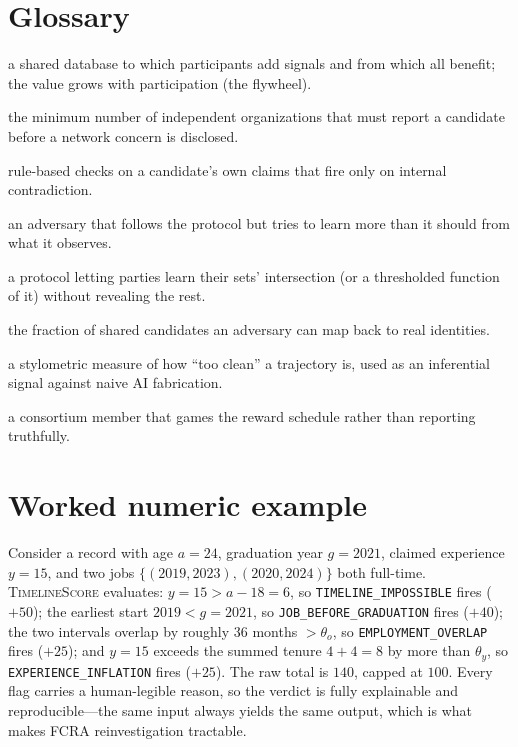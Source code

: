 \documentclass[11pt]{article}
\newcommand{\code}[1]{\texttt{\small #1}}
\begin{document}
\section{Glossary}\label{app:glossary}
\begin{description}[leftmargin=1.2em,itemsep=1pt]
\item[Contributory network] a shared database to which participants add signals
and from which all benefit; the value grows with participation (the flywheel).
\item[Corroboration threshold $t$] the minimum number of independent
organizations that must report a candidate before a network concern is disclosed.
\item[Deterministic layer] rule-based checks on a candidate's own claims that fire
only on internal contradiction.
\item[Honest-but-curious] an adversary that follows the protocol but tries to
learn more than it should from what it observes.
\item[Private set intersection (PSI)] a protocol letting parties learn their
sets' intersection (or a thresholded function of it) without revealing the rest.
\item[Re-identification rate] the fraction of shared candidates an adversary can
map back to real identities.
\item[Regularity score] a stylometric measure of how ``too clean'' a trajectory
is, used as an inferential signal against naive AI fabrication.
\item[Strategic participant] a consortium member that games the reward schedule
rather than reporting truthfully.
\end{description}

\section{Worked numeric example}\label{app:worked}
Consider a record with age $a=24$, graduation year $g=2021$, claimed experience
$y=15$, and two jobs $\{(2019,2023),(2020,2024)\}$ both full-time.
\textsc{TimelineScore} evaluates: $y=15 > a-18 = 6$, so
\code{TIMELINE\_IMPOSSIBLE} fires ($+50$); the earliest start $2019 < g=2021$, so
\code{JOB\_BEFORE\_GRADUATION} fires ($+40$); the two intervals overlap by roughly
36 months $> \theta_o$, so \code{EMPLOYMENT\_OVERLAP} fires ($+25$); and
$y=15$ exceeds the summed tenure $4+4=8$ by more than $\theta_y$, so
\code{EXPERIENCE\_INFLATION} fires ($+25$). The raw total is $140$, capped at
$100$. Every flag carries a human-legible reason, so the verdict is fully
explainable and reproducible---the same input always yields the same output, which
is what makes FCRA reinvestigation tractable.
\end{document}
